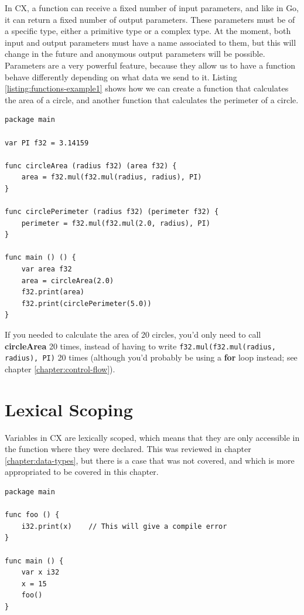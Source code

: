 \documentclass[11pt,fleqn,openany]{book} %
\begin{document}
In CX, a function can receive a fixed number of input parameters, and like in Go, it can return a fixed number of output parameters. These parameters must be of a specific type, either a primitive type or a complex type. At the moment, both input and output parameters must have a name associated to them, but this will change in the future and anonymous output parameters will be possible. Parameters are a very powerful feature, because they allow us to have a function behave differently depending on what data we send to it. Listing \ref{listing:functions-example1} shows how we can create a function that calculates the area of a circle, and another function that calculates the perimeter of a circle.

\begin{lstlisting}[caption={Determining area and perimeter of a circle using functions},captionpos=b,label={listing:functions-example1}]
package main

var PI f32 = 3.14159

func circleArea (radius f32) (area f32) {
	area = f32.mul(f32.mul(radius, radius), PI)
}

func circlePerimeter (radius f32) (perimeter f32) {
	perimeter = f32.mul(f32.mul(2.0, radius), PI)
}

func main () () {
	var area f32
	area = circleArea(2.0)
	f32.print(area)
	f32.print(circlePerimeter(5.0))
}
\end{lstlisting}

If you needed to calculate the area of 20 circles, you'd only need to call \textbf{circleArea} 20 times, instead of having to write \lstinline{f32.mul(f32.mul(radius, radius), PI)} 20 times (although you'd probably be using a \textbf{for} loop instead; see chapter \ref{chapter:control-flow}).

\section{Lexical Scoping}

Variables in CX are lexically scoped, which means that they are only accessible in the function where they were declared. This was reviewed in chapter \ref{chapter:data-types}, but there is a case that was not covered, and which is more appropriated to be covered in this chapter.

\begin{lstlisting}[caption={Lexical scoping},captionpos=b,label={listing:lexical-scoping}]
package main

func foo () {
	i32.print(x)    // This will give a compile error
}

func main () {
	var x i32
    x = 15
    foo()
}
\end{lstlisting}
\end{document}
